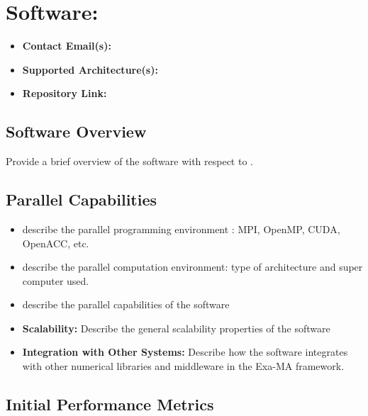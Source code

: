 \section{Software: }
\label{sec:\VAR{wp}:\VAR{software.name}:software}

\begin{itemize}
    \item \textbf{Contact Email(s):} 
    \item \textbf{Supported Architecture(s):} 
    \item \textbf{Repository Link:} \href{\VAR{software.repository}}{}
\end{itemize}

\subsection{Software Overview}
\label{sec:\VAR{wp}:\VAR{software.name}:summary}

Provide a brief overview of the software with respect to .

\subsection{Parallel Capabilities}
\label{sec:\VAR{wp}:\VAR{software.name}:performances}


\begin{itemize}
    \item describe the parallel programming  environment : MPI, OpenMP, CUDA, OpenACC, etc.
    \item describe the parallel computation environment: type of architecture and super computer used.
    \item describe the parallel capabilities of the software
    \item \textbf{Scalability:} Describe the general scalability properties of the software
    \item \textbf{Integration with Other Systems:} Describe how the software integrates with other numerical libraries and middleware in the Exa-MA framework.
\end{itemize}

\subsection{Initial Performance Metrics}
\label{sec:\VAR{wp}:\VAR{software.name}:metrics}

